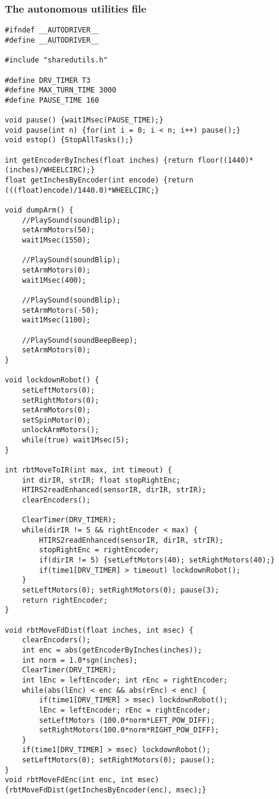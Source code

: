 \subsubsection{The autonomous utilities file}
\begin{lstlisting}
#ifndef __AUTODRIVER__
#define __AUTODRIVER__

#include "sharedutils.h"

#define DRV_TIMER T3
#define MAX_TURN_TIME 3000
#define PAUSE_TIME 160

void pause() {wait1Msec(PAUSE_TIME);}
void pause(int n) {for(int i = 0; i < n; i++) pause();}
void estop() {StopAllTasks();}

int getEncoderByInches(float inches) {return floor((1440)*(inches)/WHEELCIRC);}
float getInchesByEncoder(int encode) {return (((float)encode)/1440.0)*WHEELCIRC;}

void dumpArm() {
	//PlaySound(soundBlip);
	setArmMotors(50);
	wait1Msec(1550);

	//PlaySound(soundBlip);
	setArmMotors(0);
	wait1Msec(400);

	//PlaySound(soundBlip);
	setArmMotors(-50);
	wait1Msec(1100);

	//PlaySound(soundBeepBeep);
	setArmMotors(0);
}

void lockdownRobot() {
	setLeftMotors(0);
	setRightMotors(0);
	setArmMotors(0);
	setSpinMotor(0);
	unlockArmMotors();
	while(true) wait1Msec(5);
}

int rbtMoveToIR(int max, int timeout) {
	int dirIR, strIR; float stopRightEnc;
	HTIRS2readEnhanced(sensorIR, dirIR, strIR);
	clearEncoders();

	ClearTimer(DRV_TIMER);
	while(dirIR != 5 && rightEncoder < max) {
		HTIRS2readEnhanced(sensorIR, dirIR, strIR);
		stopRightEnc = rightEncoder;
		if(dirIR != 5) {setLeftMotors(40); setRightMotors(40);}
		if(time1[DRV_TIMER] > timeout) lockdownRobot();
	}
	setLeftMotors(0); setRightMotors(0); pause(3);
	return rightEncoder;
}

void rbtMoveFdDist(float inches, int msec) {
	clearEncoders();
	int enc = abs(getEncoderByInches(inches));
	int norm = 1.0*sgn(inches);
	ClearTimer(DRV_TIMER);
	int lEnc = leftEncoder; int rEnc = rightEncoder;
	while(abs(lEnc) < enc && abs(rEnc) < enc) {
		if(time1[DRV_TIMER] > msec) lockdownRobot();
		lEnc = leftEncoder; rEnc = rightEncoder;
		setLeftMotors (100.0*norm*LEFT_POW_DIFF);
		setRightMotors(100.0*norm*RIGHT_POW_DIFF);
	}
	if(time1[DRV_TIMER] > msec) lockdownRobot();
	setLeftMotors(0); setRightMotors(0); pause();
}
void rbtMoveFdEnc(int enc, int msec) {rbtMoveFdDist(getInchesByEncoder(enc), msec);}


\end{lstlisting}
